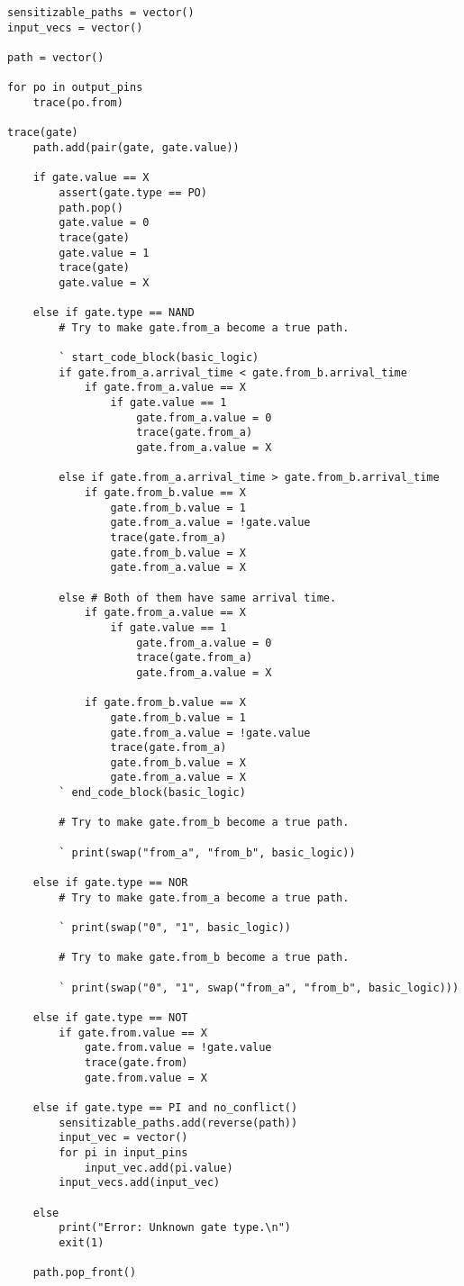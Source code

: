 \documentclass[]{article}
\begin{document}
\begin{verbatim}
sensitizable_paths = vector()
input_vecs = vector()

path = vector()

for po in output_pins
    trace(po.from)

trace(gate)
    path.add(pair(gate, gate.value))

    if gate.value == X
        assert(gate.type == PO)
        path.pop()
        gate.value = 0
        trace(gate)
        gate.value = 1
        trace(gate)
        gate.value = X

    else if gate.type == NAND
        # Try to make gate.from_a become a true path.

        ` start_code_block(basic_logic)
        if gate.from_a.arrival_time < gate.from_b.arrival_time
            if gate.from_a.value == X
                if gate.value == 1
                    gate.from_a.value = 0
                    trace(gate.from_a)
                    gate.from_a.value = X

        else if gate.from_a.arrival_time > gate.from_b.arrival_time
            if gate.from_b.value == X
                gate.from_b.value = 1
                gate.from_a.value = !gate.value
                trace(gate.from_a)
                gate.from_b.value = X
                gate.from_a.value = X

        else # Both of them have same arrival time.
            if gate.from_a.value == X
                if gate.value == 1
                    gate.from_a.value = 0
                    trace(gate.from_a)
                    gate.from_a.value = X

            if gate.from_b.value == X
                gate.from_b.value = 1
                gate.from_a.value = !gate.value
                trace(gate.from_a)
                gate.from_b.value = X
                gate.from_a.value = X
        ` end_code_block(basic_logic)

        # Try to make gate.from_b become a true path.

        ` print(swap("from_a", "from_b", basic_logic))

    else if gate.type == NOR
        # Try to make gate.from_a become a true path.

        ` print(swap("0", "1", basic_logic))

        # Try to make gate.from_b become a true path.

        ` print(swap("0", "1", swap("from_a", "from_b", basic_logic)))

    else if gate.type == NOT
        if gate.from.value == X
            gate.from.value = !gate.value
            trace(gate.from)
            gate.from.value = X

    else if gate.type == PI and no_conflict()
        sensitizable_paths.add(reverse(path))
        input_vec = vector()
        for pi in input_pins
            input_vec.add(pi.value)
        input_vecs.add(input_vec)
        
    else
        print("Error: Unknown gate type.\n")
        exit(1)

    path.pop_front()
\end{verbatim}
\end{document}
